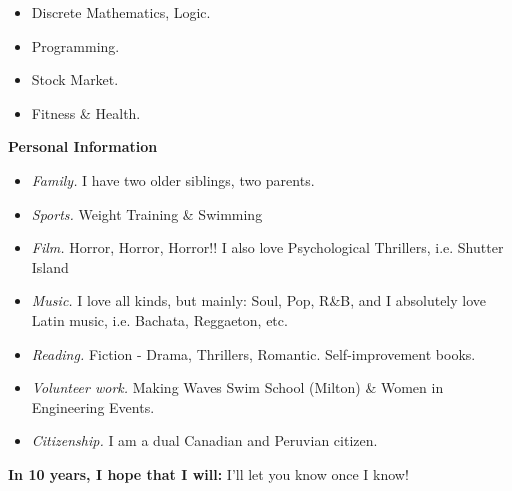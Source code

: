 \documentclass[12pt,fleqn]{article}
\newcommand{\bi}{\begin{itemize}}
\newcommand{\ei}{\end{itemize}}
\begin{document}
\bi

  \item Discrete Mathematics, Logic.

  \item Programming.

  \item Stock Market.

  \item Fitness \& Health. 
  
\ei

\noindent
\textbf{Personal Information}

\bi

  \item \emph{Family.} I have two older siblings, two parents.

  \item \emph{Sports.} Weight Training \& Swimming 

  \item \emph{Film.} Horror, Horror, Horror!! I also love Psychological Thrillers, i.e. Shutter Island

  \item \emph{Music.} I love all kinds, but mainly: Soul, Pop, R\&B, and I absolutely love Latin music, i.e. Bachata, Reggaeton, etc. 
  \item \emph{Reading.} Fiction - Drama, Thrillers, Romantic. Self-improvement books.

  \item \emph{Volunteer work.} Making Waves Swim School (Milton) \& Women in Engineering Events. 

  \item \emph{Citizenship.} I am a dual Canadian and Peruvian citizen.

\ei 

\noindent
\textbf{In 10 years, I hope that I will:} I'll let you know once I know! 
\end{document}
